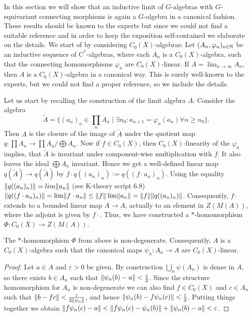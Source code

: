 In this section we will show that an inductive limit of $G$-algebras with $G$-equivariant connecting morphisms is again a $G$-algebra in a canonical fashion. These results should be known to the experts but since we could not find a suitable reference and in order to keep the exposition self-contained we elaborate on the details. We start of by considering $C_0(X)$-algebras:
	Let $(A_n,\varphi_n)_{n\in\mathbb N}$ be an inductive sequence of $\mathrm{C}^*$-al\-gebras, where each $A_n$ is a $C_0(X)$-algebra, such that the connecting homomorphisms $\varphi_n$ are $C_0(X)$-linear.
	If $A=\lim_{n\rightarrow\infty}A_n$, then $A$ is a $C_0(X)$-algebra in a canonical way. This is surely well-known to the experts, but we could not find a proper reference, so we include the details.
	
	Let us start by recalling the construction of the limit algebra $A$:
	Consider the algebra $$\widetilde{A}=\lbrace (a_n)_n\in\prod\limits_{n}A_n\mid \exists n_0: a_{n+1}=\varphi_n(a_n)\forall n\geq n_0\rbrace.$$
	Then $A$ is the closure of the image of $\widetilde{A}$ under the quotient map $q:\prod A_n\rightarrow \prod A_n/\bigoplus A_n$.
	Now if $f\in C_0(X)$, then $C_0(X)$-linearity of the $\varphi_n$ implies, that $\widetilde{A}$ is invariant under component-wise multiplication with $f$. It also leaves the ideal $\bigoplus A_n$ invariant. Hence we get a well-defined linear map
	$q(\widetilde{A})\rightarrow q(\widetilde{A})$ by $f\cdot q((a_n)_n):=q((f\cdot a_n)_n)$. Using the equality $\lVert q((a_n)_n)\rVert=lim \lVert a_n\rVert$ (see K-theory script 6.8)
	$\lVert q((f\cdot a_n)_n)\rVert=\lim \lVert f\cdot a_n\rVert\leq \lVert f\rVert\lim \lVert a_n\rVert=\lVert f\rVert\lVert q((a_n)_n)\rVert$. Consequently, $f\cdot$ extends to a bounded linear map $A\rightarrow A$, actually to an element in $Z(M(A))$, where the adjoint is given by $\overline{f}\cdot$. Thus, we have constructed a $*$-homomorphism $\Phi:C_0(X)\rightarrow Z(M(A))$. 
	\begin{lemma}\label{Lem:InductiveLimitsOfC_0(X)-algebras}
		The $*$-homomorphism $\Phi$ from above is non-degener\-ate. Consequently, $A$ is a $C_0(X)$-algebra such that the canonical maps $\psi_n:A_n\rightarrow A$ are $C_0(X)$-linear.
	\end{lemma}
	\begin{proof}
		Let $a\in A$ and $\varepsilon>0$ be given. By construction $\bigcup_n \psi(A_n)$ is dense in $A$, so there exists $b\in A_n$ such that $\lVert\psi_n(b)-a\rVert<\frac{\varepsilon}{2}$. Since the structure homomorphism for $A_n$ is non-degenerate we can also find $f\in C_0(X)$ and $c\in A_n$ such that $\lVert b-fc\rVert< \frac{\varepsilon}{2\lVert\psi_n\rVert}$, and hence $\lVert\psi_n(b)-f\psi_n(c)\rVert<\frac{\varepsilon}{2}$.
		Putting things together we obtain
		$\lVert f\psi_n(c)-a\rVert<\lVert f\psi_n(c)-\psi_n(b)\rVert+\lVert\psi_n(b)-a\rVert<\varepsilon$.
	\end{proof}
	

